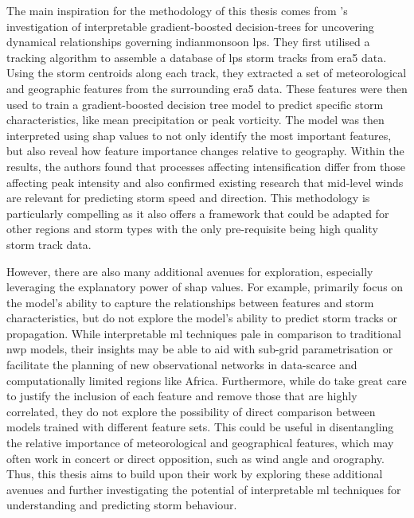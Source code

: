 The main inspiration for the methodology of this thesis comes from \cite{Hunt2024}'s investigation of interpretable gradient-boosted decision-trees for uncovering dynamical relationships governing \gls{indianmonsoon} \acrfull{lps}. They first utilised a tracking algorithm to assemble a database of \acrshort{lps} storm tracks from \acrshort{era5} data. Using the storm centroids along each track, they extracted a set of meteorological and geographic features from the surrounding \acrshort{era5} data. These features were then used to train a gradient-boosted decision tree model to predict specific storm characteristics, like mean precipitation or peak vorticity. The model was then interpreted using \acrshort{shap} values to not only identify the most important features, but also reveal how feature importance changes relative to geography. Within the results, the authors found that processes affecting intensification differ from those affecting peak intensity and also confirmed existing research that mid-level winds are relevant for predicting storm speed and direction. This methodology is particularly compelling as it also offers a framework that could be adapted for other regions and storm types with the only pre-requisite being high quality storm track data.

However, there are also many additional avenues for exploration, especially leveraging the explanatory power of \acrshort{shap} values. For example, \cite{Hunt2024} primarily focus on the model's ability to capture the relationships between features and storm characteristics, but do not explore the model's ability to predict storm tracks or propagation. While interpretable \acrshort{ml} techniques pale in comparison to traditional \acrfull{nwp} models, their insights may be able to aid with sub-grid parametrisation or facilitate the planning of new observational networks in data-scarce and computationally limited regions like Africa. Furthermore, while \cite{Hunt2024} do take great care to justify the inclusion of each feature and remove those that are highly correlated, they do not explore the possibility of direct comparison between models trained with different feature sets. This could be useful in disentangling the relative importance of meteorological and geographical features, which may often work in concert or direct opposition, such as wind angle and orography. Thus, this thesis aims to build upon their work by exploring these additional avenues and further investigating the potential of interpretable \acrshort{ml} techniques for understanding and predicting storm behaviour.

